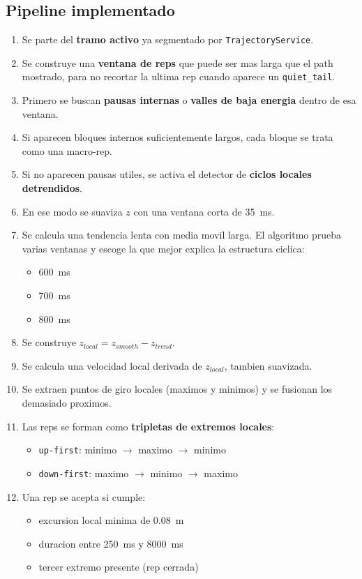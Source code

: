 ﻿\documentclass[11pt,a4paper]{article}
\begin{document}
\subsection*{Pipeline implementado}
\begin{enumerate}[leftmargin=16pt]
  \item Se parte del \textbf{tramo activo} ya segmentado por \texttt{TrajectoryService}.
  \item Se construye una \textbf{ventana de reps} que puede ser mas larga que el path mostrado, para no recortar la ultima rep cuando aparece un \texttt{quiet\_tail}.
  \item Primero se buscan \textbf{pausas internas} o \textbf{valles de baja energia} dentro de esa ventana.
  \item Si aparecen bloques internos suficientemente largos, cada bloque se trata como una macro-rep.
  \item Si no aparecen pausas utiles, se activa el detector de \textbf{ciclos locales detrendidos}.
  \item En ese modo se suaviza \(z\) con una ventana corta de \SI{35}{ms}.
  \item Se calcula una tendencia lenta con media movil larga. El algoritmo prueba varias ventanas y escoge la que mejor explica la estructura ciclica:
  \begin{itemize}[leftmargin=14pt]
    \item \SI{600}{ms}
    \item \SI{700}{ms}
    \item \SI{800}{ms}
  \end{itemize}
  \item Se construye \(z_{local} = z_{smooth} - z_{trend}\).
  \item Se calcula una velocidad local derivada de \(z_{local}\), tambien suavizada.
  \item Se extraen puntos de giro locales (maximos y minimos) y se fusionan los demasiado proximos.
  \item Las reps se forman como \textbf{tripletas de extremos locales}:
  \begin{itemize}[leftmargin=14pt]
    \item \texttt{up-first}: minimo $\rightarrow$ maximo $\rightarrow$ minimo
    \item \texttt{down-first}: maximo $\rightarrow$ minimo $\rightarrow$ maximo
  \end{itemize}
  \item Una rep se acepta si cumple:
  \begin{itemize}[leftmargin=14pt]
    \item excursion local minima de \SI{0,08}{m}
    \item duracion entre \SI{250}{ms} y \SI{8000}{ms}
    \item tercer extremo presente (rep cerrada)
  \end{itemize}
\end{enumerate}
\end{document}
